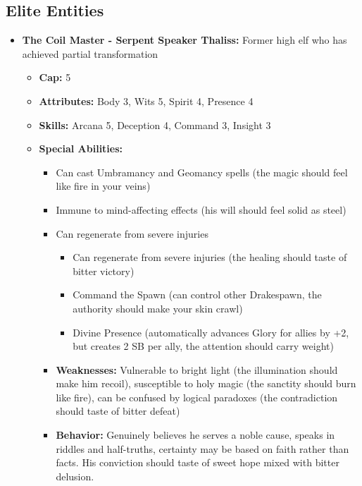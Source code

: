 \documentclass[11pt]{article}
\begin{document}
\begin{itemize}
\subsection{Elite Entities}
\begin{itemize}
\item \textbf{The Coil Master - Serpent Speaker Thaliss:} Former high elf who has achieved partial transformation
  \begin{itemize}
  \item \textbf{Cap:} 5
  \item \textbf{Attributes:} Body 3, Wits 5, Spirit 4, Presence 4
  \item \textbf{Skills:} Arcana 5, Deception 4, Command 3, Insight 3
  \item \textbf{Special Abilities:}
    \begin{itemize}
    \item Can cast Umbramancy and Geomancy spells (the magic should feel like fire in your veins)
    \item Immune to mind-affecting effects (his will should feel solid as steel)
    \item Can regenerate from severe injuries\begin{itemize}
    \item Can regenerate from severe injuries (the healing should taste of bitter victory)
    \item Command the Spawn (can control other Drakespawn, the authority should make your skin crawl)
    \item Divine Presence (automatically advances Glory for allies by +2, but creates 2 SB per ally, the attention should carry weight)
    \end{itemize}
  \item \textbf{Weaknesses:} Vulnerable to bright light (the illumination should make him recoil), susceptible to holy magic (the sanctity should burn like fire), can be confused by logical paradoxes (the contradiction should taste of bitter defeat)
  \item \textbf{Behavior:} Genuinely believes he serves a noble cause, speaks in riddles and half-truths, certainty may be based on faith rather than facts. His conviction should taste of sweet hope mixed with bitter delusion.

\end{itemize}
\end{itemize}
\end{itemize}
\end{itemize}
\end{document}
